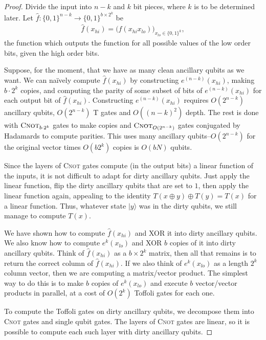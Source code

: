 \documentclass[a4paper,onecolumn,10pt,accepted=2024-05-22]{quantumarticle}
\newcommand{\ket}[1]{| #1\rangle}        %
\begin{document}
	\begin{proof}
		Divide the input into $n-k$ and $k$ bit pieces, where $k$ is to be determined later. Let $\hat{f} \colon \{ 0, 1 \}^{n-k} \to \{ 0, 1 \}^{b \times 2^k}$ be
		\begin{align}
		\hat{f}(x_{hi}) = \big( f(x_{hi} x_{lo}) \big)_{x_{lo} \in \{ 0, 1 \}^{k}},
		\end{align}
		the function which outputs the function for all possible values of the low order bits, given the high order bits. 
		
		Suppose, for the moment, that we have as many clean ancillary qubits as we want. We can na\"{i}vely compute $\hat{f}(x_{hi})$ by constructing $e^{(n-k)}(x_{hi})$, making $b \cdot 2^{k}$ copies, and computing the parity of some subset of bits of $e^{(n-k)}(x_{hi})$ for each output bit of $\hat{f}(x_{hi})$. Constructing $e^{(n-k)}(x_{hi})$ requires $O(2^{n-k})$ ancillary qubits, $O(2^{n-k})$ \textsc{T} gates and $O((n-k)^2)$ depth. The rest is done with $\textsc{Cnot}_{b \cdot 2^k}$ gates to make copies and $\textsc{Cnot}_{O(2^{n-k})}$ gates conjugated by Hadamards to compute parities. This uses many ancillary qubits--$O(2^{n-k})$ for the original vector times $O(b 2^{k})$ copies is $O(bN)$ qubits.
		
		Since the layers of \textsc{Cnot} gates compute (in the output bits) a linear function of the inputs, it is not difficult to adapt for dirty ancillary qubits. Just apply the linear function, flip the dirty ancillary qubits that are set to $1$, then apply the linear function again, appealing to the identity $T(x \oplus y) \oplus T(y) = T(x)$ for a linear function. Thus, whatever state $\ket{y}$ was in the dirty qubits, we still manage to compute $T(x)$. 
		
		We have shown how to compute $\hat{f}(x_{hi})$ and XOR it into dirty ancillary qubits. We also know how to compute $e^{k}(x_{lo})$ and XOR $b$ copies of it into dirty ancillary qubits. Think of $\hat{f}(x_{hi})$ as a $b \times 2^{k}$ matrix, then all that remains is to return the correct column of $\hat{f}(x_{hi})$. If we also think of $e^{k}(x_{lo})$ as a length $2^{k}$ column vector, then we are computing a matrix/vector product. The simplest way to do this is to make $b$ copies of $e^{k}(x_{lo})$ and execute $b$ vector/vector products in parallel, at a cost of $O(2^k)$ Toffoli gates for each one. 
		
		To compute the Toffoli gates on dirty ancillary qubits, we decompose them into \textsc{Cnot} gates and single qubit gates. The layers of \textsc{Cnot} gates are linear, so it is possible to compute each such layer with dirty ancillary qubits.
		

\end{proof}
\end{document}

